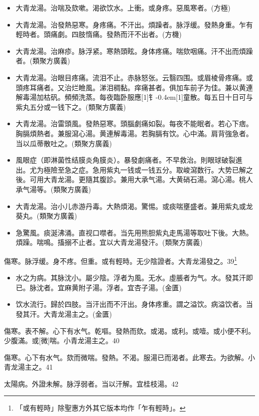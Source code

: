 \documentclass[oneside,b4paper]{ctexbook}
\begin{document}
\begin{flushleft}
\begin{itemize}
\item 大青龙湯。治喘及欬嗽。渴欲饮水。上衝。或身疼。惡風寒者。(方極)
\item 大青龙湯。治發熱惡寒。身疼痛。不汗出。煩躁者。脉浮缓。發熱身重。乍有輕時者。頭痛劇。四肢惰痛。發熱而汗不出者。(方機)
\item 大青龙湯。治麻疹。脉浮紧。寒熱頭眩。身体疼痛。喘欬咽痛。汗不出而煩躁者。(類聚方廣義)
\item 大青龙湯。治眼目疼痛。流泪不止。赤脉怒张。云翳四围。或眉棱骨疼痛。或頭疼耳痛者。又治烂瞼風。涕泪稠黏。痒痛甚者。俱加车前子为佳。兼以黄連解毒湯加枯矾。頻頻洗蒸。每夜臨卧服應{\hbox{\scalebox{0.7}[1]{钅}\kern-0.4em\scalebox{0.7}[1]{童}}}散。每五日十日可与紫丸五分或一钱下之。(類聚方廣義)
\item 大青龙湯。治雷頭風。發熱惡寒。頭腦劇痛如裂。每夜不能眠者。若心下痞。胸膈煩熱者。兼服瀉心湯。黄連解毒湯。若胸膈有饮。心中滿。肩背強急者。当以瓜蒂散吐之。(類聚方廣義)
\item 風眼症（即淋菌性结膜炎角膜炎）。暴發劇痛者。不早救治。則眼球破裂進出。尤为極險至急之症。急用紫丸一钱或一钱五分。取峻瀉数行。大势已解之後。可用大青龙湯。更隨其腹診。兼用大承气湯。大黄硝石湯。瀉心湯。桃人承气湯等。(類聚方廣義)
\item 大青龙湯。治小儿赤游丹毒。大熱煩渴。驚惕。或痰喘壅盛者。兼用紫丸或龙葵丸。(類聚方廣義)
\item 急驚風。痰涎沸涌。直视口噤者。当先用熊胆紫丸走馬湯等取吐下後。大熱。煩躁。喘鳴。搐搦不止者。宜以大青龙湯發汗。(類聚方廣義)
\end{itemize}

傷寒。脉浮缓。身不疼。但重。或有輕時。无少陰證者。大青龙湯發之。39\footnote{「或有輕時」除聖惠方外其它版本均作「乍有輕時」。}

\begin{itemize}
\item 水之为病。其脉沈小。屬少陰。浮者为風。无水。虛脹者为气。水。發其汗即已。脉沈者。宜麻黄附子湯。浮者。宜杏子湯。(金匱)
\item 饮水流行。歸於四肢。当汗出而不汗出。身体疼重。謂之溢饮。病溢饮者。当發其汗。大青龙湯主之。(金匱)
\end{itemize}

傷寒。表不解。心下有水气。乾嘔。發熱而欬。或渴。或利。或噎。或小便不利。少腹滿。或[微]喘。小青龙湯主之。40

傷寒。心下有水气。欬而微喘。發熱。不渴。服湯已而渴者。此寒去。为欲解。小青龙湯主之。41

太陽病。外證未解。脉浮弱者。当以汗解。宜桂枝湯。42


\end{flushleft}
\end{document}
